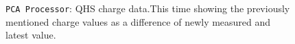 \documentclass[12pt]{article}
\begin{document}
\begin{figure}
\centering
\noindent{}
  \caption{\centering \texttt{PCA Processor}: QHS charge data.\hspace{\textwidth}This time showing the previously mentioned charge values as a difference of newly measured and latest value.}
  \label{fig:pca5}
\end{figure}
\end{document}
